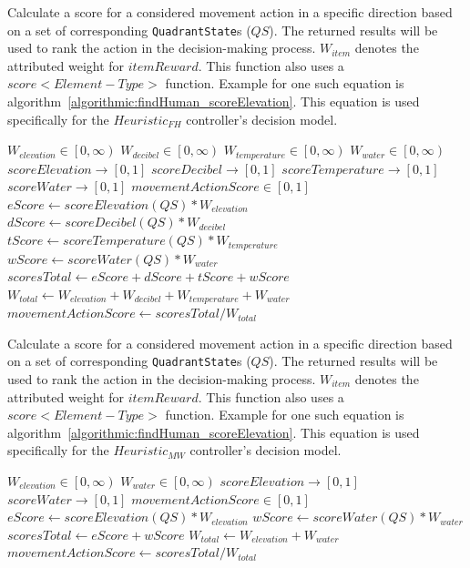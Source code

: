 \begin{algorithm}[!htb]
  \caption{Calculate a score for a considered movement action in a specific direction based on a set of corresponding \texttt{QuadrantState}s ($QS$). The returned results will be used to rank the action in the decision-making process. $W_{item}$ denotes the attributed weight for $itemReward$. This function also uses a $score<Element-Type>$ function. Example for one such equation is algorithm~\ref{algorithmic:findHuman_scoreElevation}. This equation is used specifically for the $Heuristic_{FH}$ controller's decision model.}
  \begin{algorithmic} \label{algorithmic:findHuman_scoreMovmentAction}
    \REQUIRE $W_{elevation} \in \left[0, \infty \right)$
    \REQUIRE $W_{decibel} \in \left[0, \infty \right)$
    \REQUIRE $W_{temperature} \in \left[0, \infty \right)$
    \REQUIRE $W_{water} \in \left[0, \infty \right)$
    \ENSURE $scoreElevation \rightarrow \left[0, 1 \right]$
    \ENSURE $scoreDecibel \rightarrow \left[0, 1 \right]$
    \ENSURE $scoreTemperature \rightarrow \left[0, 1 \right]$
    \ENSURE $scoreWater \rightarrow \left[0, 1 \right]$
    \ENSURE $movementActionScore \in \left[0, 1 \right]$
    \STATE $eScore \leftarrow scoreElevation(QS) * W_{elevation}$
    \STATE $dScore \leftarrow scoreDecibel(QS) * W_{decibel}$
    \STATE $tScore \leftarrow scoreTemperature(QS) * W_{temperature}$
    \STATE $wScore \leftarrow scoreWater(QS) * W_{water}$
    \STATE $scoresTotal \leftarrow eScore + dScore + tScore + wScore$
    \STATE $W_{total} \leftarrow W_{elevation} + W_{decibel} + W_{temperature} + W_{water}$
    \RETURN $movementActionScore \leftarrow scoresTotal / W_{total}$
  \end{algorithmic}
\end{algorithm}


\begin{algorithm}[!htb]
  \caption{Calculate a score for a considered movement action in a specific direction based on a set of corresponding \texttt{QuadrantState}s ($QS$). The returned results will be used to rank the action in the decision-making process. $W_{item}$ denotes the attributed weight for $itemReward$. This function also uses a $score<Element-Type>$ function. Example for one such equation is algorithm~\ref{algorithmic:findHuman_scoreElevation}. This equation is used specifically for the $Heuristic_{MW}$ controller's decision model.}
  \begin{algorithmic} \label{algorithmic:mapWater_scoreMovementAction}
    \REQUIRE $W_{elevation} \in \left[0, \infty \right)$
    \REQUIRE $W_{water} \in \left[0, \infty \right)$
    \ENSURE $scoreElevation \rightarrow \left[0, 1 \right]$
    \ENSURE $scoreWater \rightarrow \left[0, 1 \right]$
    \ENSURE $movementActionScore \in \left[0, 1 \right]$
    \STATE $eScore \leftarrow scoreElevation(QS) * W_{elevation}$
    \STATE $wScore \leftarrow scoreWater(QS) * W_{water}$
    \STATE $scoresTotal \leftarrow eScore + wScore$
    \STATE $W_{total} \leftarrow W_{elevation} + W_{water}$
    \RETURN $movementActionScore \leftarrow scoresTotal / W_{total}$
  \end{algorithmic}
\end{algorithm}


